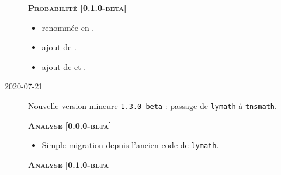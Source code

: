 \documentclass[12pt,a4paper]{book}
\begin{document}
\begin{description}
\begin{itemize}[itemsep=.5em]
        
    \end{itemize}
    
    
    \separation
    
    
    
    
    \begin{center}
        \textbf{\textsc{Probabilité [0.1.0-beta]}}
    \end{center}
    
    \begin{itemize}[itemsep=.5em]
        \item {}
               renommée en  .
    
    
        
    
        \item {}
              ajout de .
    
    
        
    
        \item {}
              ajout de  et .
    
    
        
    
    \end{itemize}
    
    
    \separation


    \medskip
    \item[2020-07-21] Nouvelle version mineure \verb+1.3.0-beta+ : passage de \verb#lymath# à \verb#tnsmath#.
    
    
    
    
    \begin{center}
        \textbf{\textsc{Analyse [0.0.0-beta]}}
    \end{center}
    
    \begin{itemize}[itemsep=.5em]
        \item Simple migration depuis l'ancien code de \verb+lymath+.
    \end{itemize}
    
    
    \begin{center}
        \textbf{\textsc{Analyse [0.1.0-beta]}}
    \end{center}
    

\end{description}
\end{document}
